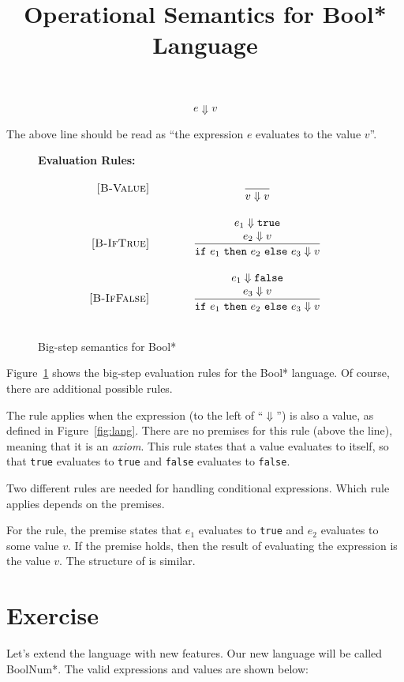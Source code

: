 \documentclass{article}
\makeatletter
\newcommand{\true}{\mbox{\tt true}}
\newcommand{\false}{\mbox{\tt false}}\title{Operational Semantics for Bool* Language}
\newcommand{\ife}[3]{\mbox{\tt if}~{#1}~\mbox{\tt then}~{#2}~\mbox{\tt else}~{#3}}
\newcommand{\bstep}[2]{{#1} \Downarrow {#2}}
\newcommand{\rel}[1]{ \mbox{\sc [#1]} }
\newcommand{\bsrule}[3]{
  \rel{#1} &
  \frac{\strut\begin{array}{@{}c@{}} #2 \end{array}}
       {\strut\begin{array}{@{}c@{}} #3 \end{array}}
   \\~\\
}
\makeatother
\begin{document}
\[
  \bstep{e}{v}
\]

The above line should be read as ``the expression $e$ evaluates to the value $v$''.

\begin{figure}
\caption{Big-step semantics for Bool*}
\label{fig:bigstep}
  {\bf Evaluation Rules:~~~ \fbox{$\bstep{e}{v}$}} \\
\[
\begin{array}{r@{\qquad\qquad}c}
\bsrule{B-Value}{}{
  \bstep{v}{v}
}
\bsrule{B-IfTrue}{
  \bstep{e_1}{\true} \\
  \bstep{e_2}{v}
}{
  \bstep{\ife{e_1}{e_2}{e_3}}{v}
}
\bsrule{B-IfFalse}{
  \bstep{e_1}{\false} \\
  \bstep{e_3}{v}
}{
  \bstep{\ife{e_1}{e_2}{e_3}}{v}
}
\end{array}
\]
\end{figure}



Figure~\ref{fig:bigstep} shows the big-step evaluation rules for the Bool* language.
Of course, there are additional possible rules.

The \rel{B-Value} rule applies when the expression (to the left of ``$\Downarrow$'')
is also a value, as defined in Figure~\ref{fig:lang}.
There are no premises for this rule (above the line),
meaning that it is an {\em axiom}.
This rule states that a value evaluates to itself,
so that \true{} evaluates to \true{} and \false{} evaluates to \false{}.

Two different rules are needed for handling conditional expressions.
Which rule applies depends on the premises.

For the \rel{B-IfTrue} rule,
the premise states that $e_1$ evaluates to \true{}
and $e_2$ evaluates to some value $v$.
If the premise holds, then the result of evaluating the expression is the value $v$.
The structure of \rel{B-IfFalse} is similar.


\section*{Exercise}

Let's extend the language with new features.
Our new language will be called BoolNum*.
The valid expressions and values are shown below:
\end{document}
